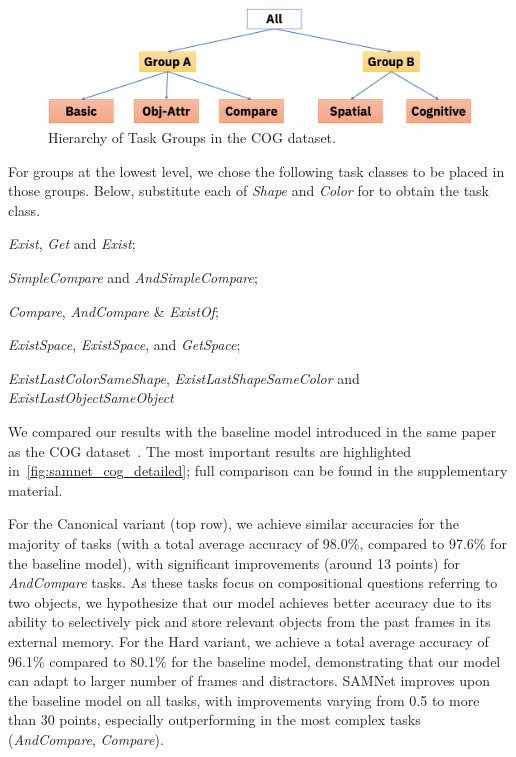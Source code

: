 \begin{figure}[htbp]
	\centering
	\includegraphics[width=\columnwidth]{../img/architecture/hierarchy}
	\caption{Hierarchy of Task Groups in the COG dataset.}
	\label{fig:task-groups}
\end{figure}



For groups at the lowest level, we chose the following task classes to be placed in those groups.
Below, substitute each of \textit{Shape} and \textit{Color} for  \uX{} to obtain the task class.
\begin{description}
	\compresslist
	\item[Basic:] \textit{Exist}\uX, \textit{Get}\uX{} and \textit{Exist};
	\item[Obj-Attr:] \emph{SimpleCompare}\uX{} and \textit{AndSimpleCompare}\uX;
	\item[Compare:] \textit{Compare}\uX,  \textit{AndCompare}\uX{} \& \textit{Exist}\uX\textit{Of};
	\item[Spatial:] \textit{ExistSpace}, \textit{Exist}\uX\textit{Space}, and \textit{Get}\uX\textit{Space};
	\item[Cognitive:] \textit{ExistLastColorSameShape}, \textit{ExistLastShapeSameColor} and \textit{ExistLastObjectSameObject}
\end{description}


We compared our results with the baseline model introduced in the same paper as the COG dataset~\cite{yang2018dataset}.
The most important results are highlighted in~\cref{fig:samnet_cog_detailed}; full comparison can be found in the supplementary material.

For the Canonical variant (top row), we achieve similar accuracies for the majority of tasks (with a total average accuracy of 98.0\%, compared to 97.6\% for the baseline model), with significant improvements (around 13 points) for \textit{AndCompare} tasks.
As these tasks focus on compositional questions referring to two objects, we hypothesize that our model achieves better accuracy due to its ability to selectively pick and store relevant objects from the past frames in its external memory.
For the Hard variant, we achieve a total average accuracy of 96.1\% compared to 80.1\% for the baseline model, demonstrating that our model can adapt to larger number of frames and distractors.
SAMNet improves upon the baseline model on all tasks, with improvements varying from 0.5 to more than 30 points, especially outperforming in the most complex tasks (\textit{AndCompare}\uX, \textit{Compare}\uX).



